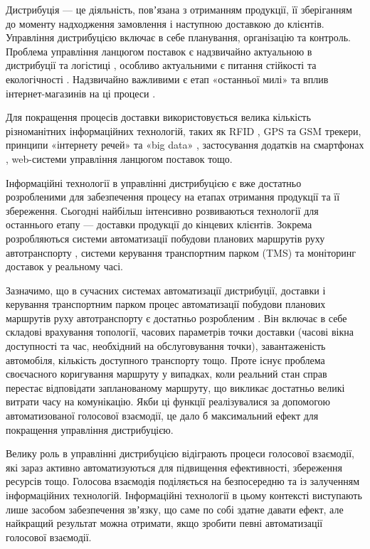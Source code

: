 Дистрибуція — це діяльність, повʼязана з отриманням продукції, її зберіганням до моменту надходження замовлення і наступною доставкою до клієнтів. Управління дистрибуцією включає в себе планування, організацію та контроль. Проблема управління ланцюгом поставок є надзвичайно актуальною в дистрибуції та логістиці \cite{Speranza_2018}, особливо актуальними є питання стійкості \cite{Koberg_2018,Jia_2018,Bastas_2019,Wen_2018,Sullet_2018} та екологічності \cite{Tseng_2019,Papetti_2019,Hoehne_2017}. Надзвичайно важливими є етап «останньої милі» \cite{Baldi_2018,Gdowska_2018,Boysen_2018,Hoehne_2017,Pronello_2017,Cook_2017} та вплив інтернет-магазинів на ці процеси \cite{Allen_2018,Cardenas_2017}.

Для покращення процесів доставки використовується велика кількість різноманітних інформаційних технологій, таких як RFID \cite{Prasanna_2012}, GPS \cite{Stopher_2018,Prasanna_2012} та GSM \cite{Prasanna_2012} трекери, принципи «інтернету речей» \cite{Liu_2018} та «big data» \cite{Govindan_2018}, застосування додатків на смартфонах \cite{Stopher_2018}, web-системи управління ланцюгом поставок \cite{Papetti_2019} тощо.

Інформаційні технології в управлінні дистрибуцією є вже достатньо розробленими для забезпечення процесу на етапах отримання продукції та її збереження. Сьогодні найбільш інтенсивно розвиваються технології для останнього етапу ---  доставки продукції до кінцевих клієнтів. Зокрема розробляються системи автоматизації побудови планових маршрутів руху автотранспорту \cite{art1}, системи керування транспортним парком (TMS) та моніторинг доставок у реальному часі.

Зазначимо, що в сучасних системах автоматизації дистрибуції, доставки і керування транспортним парком процес автоматизації побудови планових маршрутів руху автотранспорту є  достатньо розробленим \cite{art1}. Він включає в себе складові врахування топології, часових параметрів точки доставки (часові вікна доступності та час, необхідний на обслуговування точки), завантаженість автомобіля, кількість доступного транспорту тощо. Проте існує проблема своєчасного коригування маршруту у випадках, коли реальний стан справ перестає відповідати запланованому маршруту, що викликає достатньо великі витрати часу на комунікацію. Якби ці функції реалізувалися за допомогою автоматизованої голосової взаємодії, це дало б максимальний ефект для покращення управління дистрибуцією.

Велику роль в управлінні дистрибуцією відіграють процеси голосової взаємодії, які зараз активно автоматизуються для підвищення ефективності, збереження ресурсів тощо. Голосова взаємодія поділяється на безпосередню та із залученням інформаційних технологій. Інформаційні технології в цьому контексті виступають  лише засобом забезпечення звʼязку, що саме по собі здатне давати ефект, але найкращий результат можна отримати, якщо зробити певні автоматизації голосової взаємодії.


